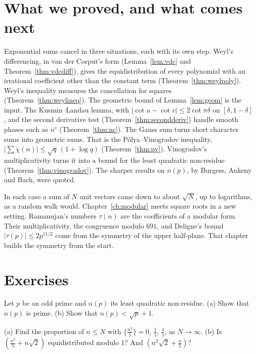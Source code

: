\section{What we proved, and what comes next}

Exponential sums cancel in three situations, each with its own step. Weyl's differencing, in van der Corput's form (Lemma~\ref{lem:vdc} and Theorem~\ref{thm:vdcdiff}), gives the equidistribution of every polynomial with an irrational coefficient other than the constant term (Theorem~\ref{thm:weylpoly}). Weyl's inequality measures the cancellation for squares (Theorem~\ref{thm:weylineq}). The geometric bound of Lemma~\ref{lem:geom} is the input. The Kusmin--Landau lemma, with $|\cot u-\cot v|\le 2\cot\pi\delta$ on $[\delta,1-\delta]$, and the second derivative test (Theorem~\ref{thm:secondderiv}) handle smooth phases such as $n^c$ (Theorem~\ref{thm:nc}). The Gauss sum turns short character sums into geometric sums. That is the Pólya--Vinogradov inequality, $\bigl|\sum\chi(n)\bigr|\le\sqrt q\,(1+\log q)$ (Theorem~\ref{thm:pv}). Vinogradov's multiplicativity turns it into a bound for the least quadratic non-residue (Theorem~\ref{thm:vinogradov}). The sharper results on $n(p)$, by Burgess, Ankeny and Bach, were quoted.

In each case a sum of $N$ unit vectors came down to about $\sqrt N$, up to logarithms, as a random walk would. Chapter~\ref{ch:modular} meets square roots in a new setting. Ramanujan's numbers $\tau(n)$ are the coefficients of a modular form. Their multiplicativity, the congruence modulo $691$, and Deligne's bound $|\tau(p)|\le2p^{11/2}$ come from the symmetry of the upper half-plane. That chapter builds the symmetry from the start.

\section{Exercises}

\begin{exercise}[$\star$]\label{ex:nonres}
Let $p$ be an odd prime and $n(p)$ its least quadratic non-residue. (a) Show that $n(p)$ is prime. (b) Show that $n(p)<\sqrt p+1$.
\end{exercise}

\begin{exercise}[$\star$]\label{ex:rationalsq}
(a) Find the proportion of $n\le N$ with $\{\frac{n^2}5\}=0$, $\frac15$, $\frac45$, as $N\to\infty$. (b) Is $(\frac{n^2}5+n\sqrt2)$ equidistributed modulo $1$? And $(n^2\sqrt2+\frac n5)$?
\end{exercise}

